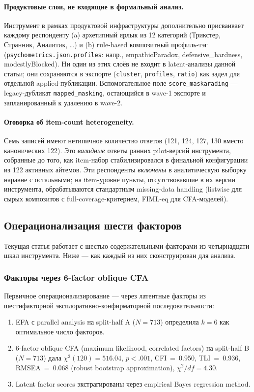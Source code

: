 \paragraph{Продуктовые слои, не входящие в формальный анализ.} Инструмент в рамках продуктовой инфраструктуры дополнительно присваивает каждому респонденту (a) архетипный ярлык из 12 категорий (Трикстер, Странник, Аналитик, \dots) и (b) rule-based композитный профиль-тэг (\texttt{psychometrics.json.profiles}: напр., empathicParadox, defensive\_hardness, modestlyBlocked). Ни один из этих слоёв не входит в latent-анализы данной статьи; они сохраняются в экспорте (\texttt{cluster}, \texttt{profiles}, \texttt{ratio}) как задел для отдельной applied-публикации. Вспомогательное поле \texttt{score\_maskarading} --- legacy-дубликат \texttt{mapped\_masking}, остающийся в wave-1 экспорте и запланированный к удалению в wave-2.

\paragraph{Оговорка об item-count heterogeneity.} Семь записей имеют нетипичное количество ответов (121, 124, 127, 130 вместо канонических 122). Это \emph{валидные} ответы ранних pilot-версий инструмента, собранные до того, как item-набор стабилизировался в финальной конфигурации из 122 активных айтемов. Эти респонденты \emph{включены} в аналитическую выборку наравне с остальными; на item-уровне пункты, отсутствовавшие в их версии инструмента, обрабатываются стандартным missing-data handling (listwise для сырых композитов с full-coverage-критерием, FIML-eq для CFA-моделей).

\subsection{Операционализация шести факторов}
\label{subsec:six_factor_ops}

Текущая статья работает с шестью содержательными факторами из четырнадцати шкал инструмента. Ниже --- как каждый из них сконструирован для анализа.

\subsubsection{Факторы через 6-factor oblique CFA}

Первичное операционализирование --- через латентные факторы из шестифакторной эксплоративно-конфирматорной последовательности:
\begin{enumerate}
    \item EFA с parallel analysis на split-half A ($N = 713$) определила $k = 6$ как оптимальное число факторов.
    \item 6-factor oblique CFA (maximum likelihood, correlated factors) на split-half B ($N = 713$) дала $\chi^2(120) = 516.04$, $p < .001$, CFI~=~0.950, TLI~=~0.936, RMSEA~=~0.068 (robust bootstrap approximation), $\chi^2/df = 4.30$.
    \item Latent factor scores экстрагированы через empirical Bayes regression method.
\end{enumerate}

